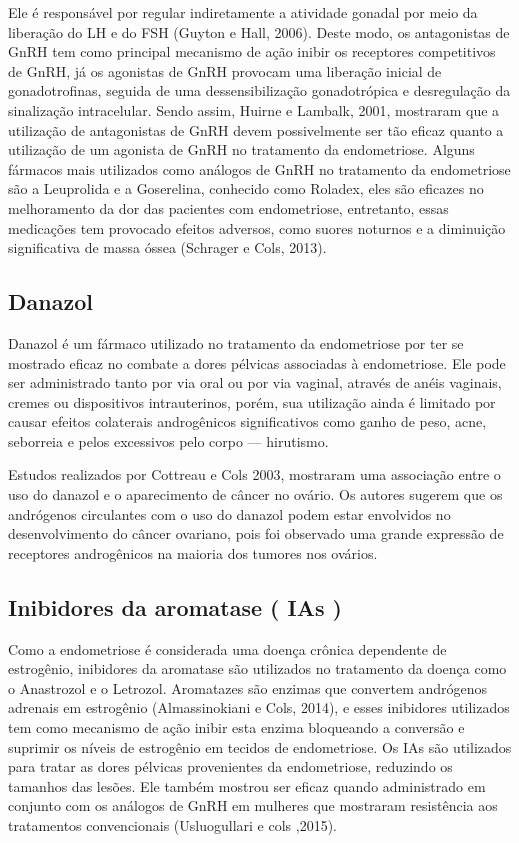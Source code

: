 \documentclass[12pt]{article} %
\begin{document}
Ele é responsável por regular indiretamente a atividade gonadal por
meio da liberação do LH e do FSH (Guyton e Hall, 2006). Deste modo, os
antagonistas de GnRH tem como principal mecanismo de ação inibir os
receptores competitivos de GnRH, já os agonistas de GnRH provocam uma
liberação inicial de gonadotrofinas, seguida de uma dessensibilização
gonadotrópica e desregulação da sinalização intracelular. Sendo assim,
Huirne e Lambalk, 2001, mostraram que a utilização de antagonistas de
GnRH devem possivelmente ser tão eficaz quanto a utilização de um
agonista de GnRH no tratamento da endometriose.  Alguns fármacos mais
utilizados como análogos de GnRH no tratamento da endometriose são a
Leuprolida e a Goserelina, conhecido como Roladex, eles são eficazes %
no melhoramento da dor das pacientes com endometriose, entretanto,
essas medicações tem provocado efeitos adversos, como suores noturnos
e a diminuição significativa de massa óssea (Schrager e Cols, 2013).

\subsection{Danazol}

Danazol é um fármaco utilizado no tratamento da endometriose por ter
se mostrado eficaz no combate a dores pélvicas associadas à
endometriose. Ele pode ser administrado tanto por via oral ou por via
vaginal, através de anéis vaginais, cremes ou dispositivos
intrauterinos, porém, sua utilização ainda é limitado por causar
efeitos colaterais androgênicos significativos como ganho de peso,
acne, seborreia e pelos excessivos pelo corpo --- hirutismo.

Estudos realizados por Cottreau e Cols 2003, mostraram uma associação
entre o uso do danazol e o aparecimento de câncer no ovário. Os
autores sugerem que os andrógenos circulantes com o uso do danazol
podem estar envolvidos no desenvolvimento do câncer ovariano, pois foi
observado uma grande expressão de receptores androgênicos na maioria
dos tumores nos ovários.

\subsection{Inibidores da aromatase ( IAs )}

Como a endometriose é considerada uma doença crônica dependente de
estrogênio, inibidores da aromatase são utilizados no tratamento da
doença como o Anastrozol e o Letrozol. Aromatazes são enzimas que
convertem andrógenos adrenais em estrogênio (Almassinokiani e Cols,
2014), e esses inibidores utilizados tem como mecanismo de ação inibir
esta enzima bloqueando a conversão e suprimir os níveis de estrogênio
em tecidos de endometriose. Os IAs são utilizados para tratar as dores
pélvicas provenientes da endometriose, reduzindo os tamanhos das
lesões. Ele também mostrou ser eficaz quando administrado em conjunto
com os análogos de GnRH em mulheres que mostraram resistência aos
tratamentos convencionais (Usluogullari e cols ,2015).
\end{document}
